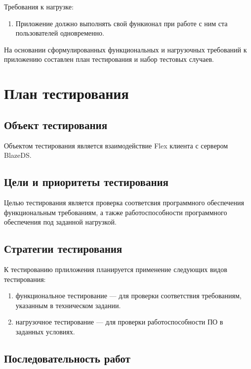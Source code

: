 Требования к нагрузке:

\begin{enumerate}
\item Приложение должно выполнять свой функионал при работе с ним ста пользователей одновременно.
\end{enumerate}

На основании сформулированных функциональных и нагрузочных требований к приложению составлен план тестирования
и набор тестовых случаев.

\section{План тестирования}

\subsection{Объект тестирования}

Объектом тестирования является взаимодействие Flex клиента с сервером BlazeDS.

\subsection{Цели и приоритеты тестирования}

Целью тестирования является проверка соответсвия программного обеспечения функциональным требованиям,
а также работоспособности программного обеспечения под заданной нагрузкой.

\subsection{Стратегии тестирования}

К тестированию прлиложения планируется применение следующих видов тестирования:

\begin{enumerate}
\item функциональное тестирование --- для проверки соответствия требованиям, указанным в техническом задании.
\item нагрузочное тестирование --- для проверки работоспособности ПО в заданных условиях.
\end{enumerate}

\subsection{Последовательность работ}

